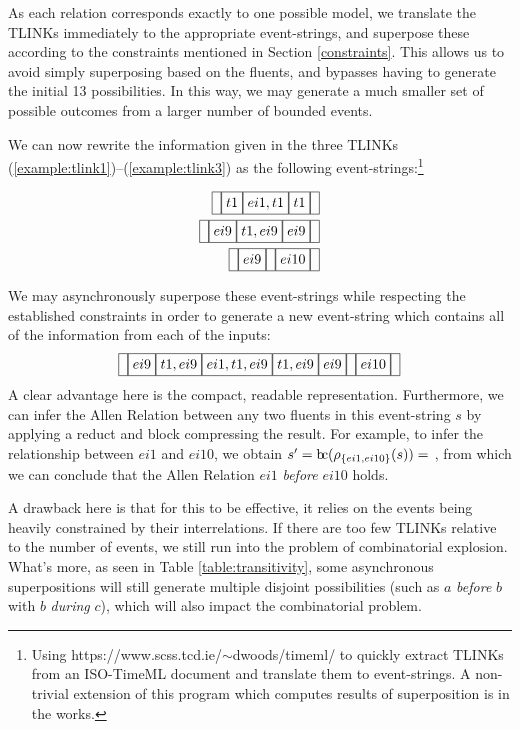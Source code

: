 \documentclass[a4paper,11pt,leqno]{article}
\newcommand{\bc}{{\rm b\!c}}
\newcommand{\vph}[1]{\vphantom{#1}}
\newcommand{\ebox}[1]{\fbox{$\vph{',}#1$}}
\begin{document}
As each relation corresponds exactly to one possible model, we translate the 
TLINKs immediately to the appropriate event-strings, and superpose these 
according to the constraints mentioned in Section \ref{constraints}. This 
allows us to avoid simply superposing based on the fluents, and bypasses having 
to generate the initial 13 possibilities. In this way, we may generate a much 
smaller set of possible outcomes from a larger number of bounded events.

We can now rewrite the information given in the three TLINKs 
(\ref{example:tlink1})--(\ref{example:tlink3}) as the following 
event-strings:\footnote{Using https://www.scss.tcd.ie/$\sim$dwoods/timeml/ to 
quickly extract TLINKs from an ISO-TimeML document and translate them to 
event-strings. A non-trivial extension of this program which computes results 
of superposition is in the works.}

\begin{subequations}
\begin{align}
\ebox{}\ebox{t1}\ebox{ei1,t1}\ebox{t1}\ebox{}\\
\ebox{}\ebox{ei9}\ebox{t1,ei9}\ebox{ei9}\ebox{}\\
\ebox{}\ebox{ei9}\ebox{}\ebox{ei10}\ebox{}
\end{align}
\end{subequations}

We may asynchronously superpose these event-strings while respecting the 
established constraints in order to generate a new event-string which contains 
all of the information from each of the inputs:
\begin{align}
\ebox{}\ebox{ei9}\ebox{t1,ei9}\ebox{ei1,t1,ei9}\ebox{t1,ei9}\ebox{ei9}\ebox{}\ebox{ei10}\ebox{}
\end{align}
A clear advantage here is the compact, readable representation. Furthermore, we 
can infer the Allen Relation between any two fluents in this event-string $s$ 
by applying a reduct and block compressing the result. For example, to infer the
relationship between $ei1$ and $ei10$, we obtain $s' = 
\bc{}(\rho_{\{ei1,ei10\}}(s)) = $ \ebox{}\ebox{ei1}\ebox{}\ebox{ei10}\ebox{}, 
from which we can conclude that the Allen Relation $ei1$ \textit{before} $ei10$ 
holds.

A drawback here is that for this to be effective, it relies on the events being 
heavily constrained by their interrelations. If there are too few TLINKs 
relative to the number of events, we still run into the problem of 
combinatorial explosion. What's more, as seen in Table 
\ref{table:transitivity}, some asynchronous superpositions will still generate 
multiple disjoint possibilities (such as $a$ \textit{before} $b$ with $b$ 
\textit{during} $c$), which will also impact the combinatorial problem.
\end{document}
